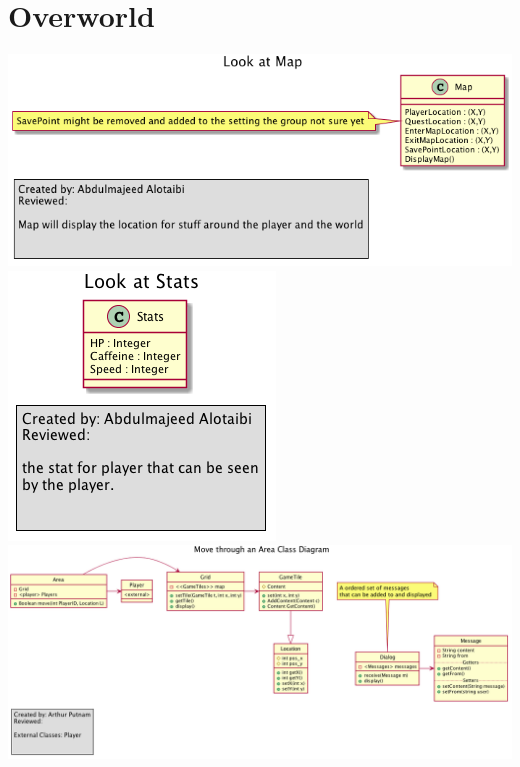 \documentclass[12pt]{article}
\begin{document}
\section{Overworld}
\includegraphics[width=\textwidth]{overworld-1.png}
\includegraphics[width=\textwidth]{overworld-2.png}
\includegraphics[width=\textwidth]{overworld-3.png}
\end{document}
